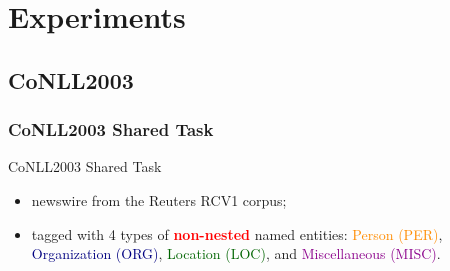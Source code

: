 \documentclass{beamer}
\begin{document}
\section{Experiments} 


\subsection{CoNLL2003}

\begin{frame}
\frametitle{CoNLL2003 Shared Task}
\begin{block}{CoNLL2003 Shared Task}
	\begin{itemize}
	\item newswire from the Reuters RCV1 corpus;
	\item tagged with 4 types of \textbf{\textcolor{red}{non-nested}} named entities: 
			\textcolor{darkorange}{Person (PER)}, 
			\textcolor{navy}{Organization (ORG)},
			\textcolor{darkgreen}{Location (LOC)}, and
			\textcolor{darkmagenta}{Miscellaneous (MISC)}.
	\end{itemize}
\end{block}
\begin{table}
    \centering
    \caption{\scriptsize Data distribution of CoNLL2003}
\end{table}
\end{frame}
\end{document}
